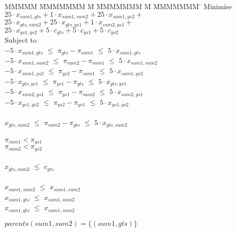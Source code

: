 \begin{tabbing}
MMMMM   \= MMMMMMM \= M \= MMMMMMM \= M \= MMMMMMM \= \kill
Minimise   \> $25 \cdot x_{sum1, gts} + 1 \cdot x_{sum1,sum2} + 25 \cdot x_{sum1, ys2} +$ \\
           \> $25 \cdot x_{gts, sum2} + 25 \cdot x_{gts, ys1} + 1 \cdot x_{sum2, ys1} +$ \\
           \> $ 25 \cdot x_{ys1, ys2} + 5 \cdot c_{gts} + 5 \cdot c_{ys1} + 5 \cdot c_{ys2} $\\
Subject to \\
    \> $-5 \cdot x_{sum1, gts}$  \> $\le$ \> $\pi_{gts} - \pi_{sum1}$  \> $\le$ \> $5 \cdot x_{sum1, gts}$  \\
    \> $-5 \cdot x_{sum1, sum2}$ \> $\le$ \> $\pi_{sum2} - \pi_{sum1}$ \> $\le$ \> $5 \cdot x_{sum1, sum2}$ \\
    \> $-5 \cdot x_{sum1, ys2 }$ \> $\le$ \> $\pi_{ys2 } - \pi_{sum1}$ \> $\le$ \> $5 \cdot x_{sum1, ys2 }$ \\
    \> $-5 \cdot x_{gts,  ys1 }$ \> $\le$ \> $\pi_{ys1 } - \pi_{gts }$ \> $\le$ \> $5 \cdot x_{gts, ys1  }$ \\
    \> $-5 \cdot x_{sum2, ys1 }$ \> $\le$ \> $\pi_{ys1 } - \pi_{sum2}$ \> $\le$ \> $5 \cdot x_{sum2, ys1 }$ \\
    \> $-5 \cdot x_{ys1, ys2  }$ \> $\le$ \> $\pi_{ys2 } - \pi_{ys1 }$ \> $\le$ \> $5 \cdot x_{ys1, ys2  }$ \\
\\
    \> $   x_{gts, sum2 }$ \> $\le$ \> $\pi_{sum2} - \pi_{gts }$ \> $\le$ \> $5 \cdot x_{gts, sum2 }$ \\
\\
    \>                     \>       \> $\pi_{sum1} < \pi_{ys1}$ \\
    \>                     \>       \> $\pi_{sum2} < \pi_{ys2}$ \\
\\
    \> $ x_{gts,sum2} $    \> $\le$ \> $c_{gts}$ \\
\\
    \> $x_{sum1,sum2}$     \> $\le$ \> $x_{sum1, sum2}$ \\
    \> $x_{sum1, gts}$     \> $\le$ \> $x_{sum1, sum2}$ \\
    \> $x_{sum1, gts}$     \> $\le$ \> $x_{sum1, sum2}$ \\
\end{tabbing}
$parents(sum1,sum2)  = \{(sum1, gts)\}$

